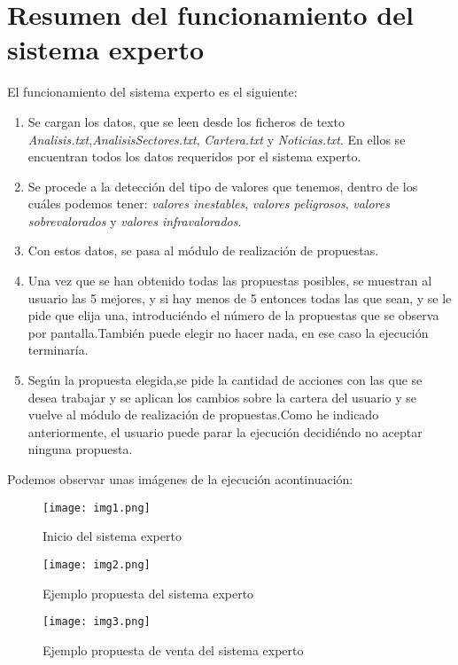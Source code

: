 \section{Resumen del funcionamiento del sistema experto}
El funcionamiento del sistema experto es el siguiente:
\begin{enumerate}
	\item Se cargan los datos, que se leen desde los ficheros de texto \textit{Analisis.txt},\textit{AnalisisSectores.txt}, \textit{Cartera.txt} y \textit{Noticias.txt}. En ellos se encuentran todos los datos requeridos por el sistema experto.
	\item Se procede a la detección del tipo de valores que tenemos, dentro de los cuáles podemos tener: \textit{valores inestables}, \textit{valores peligrosos}, \textit{valores sobrevalorados} y \textit{valores infravalorados}.
	\item Con estos datos, se pasa al módulo de realización de propuestas.
	\item Una vez que se han obtenido todas las propuestas posibles, se muestran al usuario las 5 mejores, y si hay menos de 5 entonces todas las que sean, y se le pide que elija una, introduciéndo el número de la propuestas que se observa por pantalla.También puede elegir no hacer nada, en ese caso la ejecución terminaría.
	\item Según la propuesta elegida,se pide la cantidad de acciones con las que se desea trabajar y se aplican los cambios sobre la cartera del usuario y se vuelve al módulo de realización de propuestas.Como he indicado anteriormente, el usuario puede parar la ejecución decidiéndo no aceptar ninguna propuesta.
\end{enumerate}
Podemos observar unas imágenes de la ejecución acontinuación: \\
\begin{figure}[H]
	\centering
	\texttt{[image: img1.png]}
	\caption{Inicio del sistema experto}
	\label{fig:iniciodelsistema}
\end{figure}
\begin{figure}[H]
	\centering
	\texttt{[image: img2.png]}
	\caption{Ejemplo propuesta del sistema experto}
	\label{fig:propuesta}
\end{figure}
\begin{figure}[H]
	\centering
	\texttt{[image: img3.png]}
	\caption{Ejemplo propuesta de venta del sistema experto}
	\label{fig:cantidad}
\end{figure}

